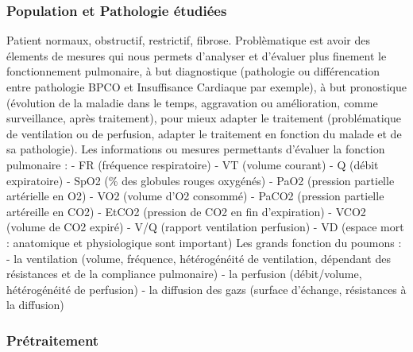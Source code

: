 \documentclass[12pt,]{article}
\begin{document}
\hypertarget{population-et-pathologie-etudiees}{%
\subsubsection{Population et Pathologie
étudiées}\label{population-et-pathologie-etudiees}}

Patient normaux, obstructif, restrictif, fibrose. Problèmatique est
avoir des élements de mesures qui nous permets d'analyser et d'évaluer
plus finement le fonctionnement pulmonaire, à but diagnostique
(pathologie ou différencation entre pathologie BPCO et Insuffisance
Cardiaque par exemple), à but pronostique (évolution de la maladie dans
le temps, aggravation ou amélioration, comme surveillance, après
traitement), pour mieux adapter le traitement (problématique de
ventilation ou de perfusion, adapter le traitement en fonction du malade
et de sa pathologie). Les informations ou mesures permettants d'évaluer
la fonction pulmonaire : - FR (fréquence respiratoire) - VT (volume
courant) - Q (débit expiratoire) - SpO2 (\% des globules rouges
oxygénés) - PaO2 (pression partielle artérielle en O2) - VO2 (volume
d'O2 consommé) - PaCO2 (pression partielle artéreille en CO2) - EtCO2
(pression de CO2 en fin d'expiration) - VCO2 (volume de CO2 expiré) -
V/Q (rapport ventilation perfusion) - VD (espace mort : anatomique et
physiologique sont important) Les grands fonction du poumons : - la
ventilation (volume, fréquence, hétérogénéité de ventilation, dépendant
des résistances et de la compliance pulmonaire) - la perfusion
(débit/volume, hétérogénéité de perfusion) - la diffusion des gazs
(surface d'échange, résistances à la diffusion)

\hypertarget{pretraitement}{%
\subsubsection{Prétraitement}\label{pretraitement}}
\end{document}
